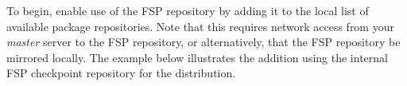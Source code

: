 To begin, enable use of the FSP repository by adding it to the local list of
available package repositories.  Note that this requires network access from
your {\em master} server to the FSP repository, or alternatively, that the FSP
repository be mirrored locally. The example below illustrates the addition
using the internal FSP checkpoint repository for the \baseOS{} distribution.
